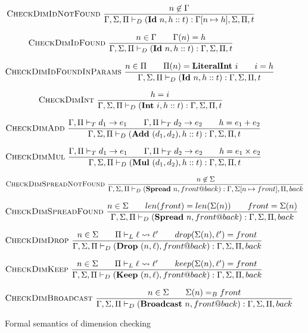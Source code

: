 \documentclass{report}
\begin{document}
\begin{figure}
    $$\textsc{CheckDimIdNotFound}~\frac{n \not\in \Gamma}{\Gamma, \Sigma, \Pi \vdash_D (\textbf{Id}~n, h :: t) : \Gamma[n \mapsto h], \Sigma, \Pi, t}$$

    $$\textsc{CheckDimIdFound}~\frac{n \in \Gamma \qquad \Gamma(n) = h}{\Gamma, \Sigma, \Pi \vdash_D (\textbf{Id}~n, h :: t) : \Gamma, \Sigma, \Pi, t}$$

    $$\textsc{CheckDimIdFoundInParams}~\frac{n \in \Pi \qquad \Pi(n) = \textbf{LiteralInt}~i \qquad i = h}{\Gamma, \Sigma, \Pi \vdash_D (\textbf{Id}~n, h :: t) : \Gamma, \Sigma, \Pi, t}$$

    $$\textsc{CheckDimInt}~\frac{h = i}{\Gamma, \Sigma, \Pi \vdash_D (\textbf{Int}~i, h :: t) : \Gamma, \Sigma, \Pi, t}$$

    $$\textsc{CheckDimAdd}~\frac{\Gamma, \Pi \vdash_T d_1 \rightarrow e_1 \qquad \Gamma, \Pi \vdash_T d_2 \rightarrow e_2 \qquad h = e_1 + e_2}{\Gamma, \Sigma, \Pi \vdash_D (\textbf{Add}~(d_1, d_2), h :: t) : \Gamma, \Sigma, \Pi, t}$$

    $$\textsc{CheckDimMul}~\frac{\Gamma, \Pi \vdash_T d_1 \rightarrow e_1 \qquad \Gamma, \Pi \vdash_T d_2 \rightarrow e_2 \qquad h = e_1 \times e_2}{\Gamma, \Sigma, \Pi \vdash_D (\textbf{Mul}~(d_1, d_2), h :: t) : \Gamma, \Sigma, \Pi, t}$$

    $$\textsc{CheckDimSpreadNotFound}~\frac{n \not\in \Sigma}{\Gamma, \Sigma, \Pi \vdash_D (\textbf{Spread}~n, front @ back) : \Gamma, \Sigma[n \mapsto front], \Pi, back}$$

    $$\textsc{CheckDimSpreadFound}~\frac{n \in \Sigma \qquad len(front) = len(\Sigma(n)) \qquad front = \Sigma(n)}{\Gamma, \Sigma, \Pi \vdash_D (\textbf{Spread}~n, front @ back) : \Gamma, \Sigma, \Pi, back}$$

    $$\textsc{CheckDimDrop}~\frac{n \in \Sigma \qquad \Pi \vdash_L \ell \rightsquigarrow \ell' \qquad drop(\Sigma(n), \ell') = front}{\Gamma, \Sigma, \Pi \vdash_D (\textbf{Drop}~(n, \ell), front @ back) : \Gamma, \Sigma, \Pi, back}$$

    $$\textsc{CheckDimKeep}~\frac{n \in \Sigma \qquad \Pi \vdash_L \ell \rightsquigarrow \ell' \qquad keep(\Sigma(n), \ell') = front}{\Gamma, \Sigma, \Pi \vdash_D (\textbf{Keep}~(n, \ell), front @ back) : \Gamma, \Sigma, \Pi, back}$$

    $$\textsc{CheckDimBroadcast}~\frac{n \in \Sigma \qquad \Sigma(n) =_B front}{\Gamma, \Sigma, \Pi \vdash_D (\textbf{Broadcast}~n, front @ back) : \Gamma, \Sigma, \Pi, back}$$

    \caption{Formal semantics of dimension checking}
    \label{semantics:dim}
\end{figure}
\end{document}
